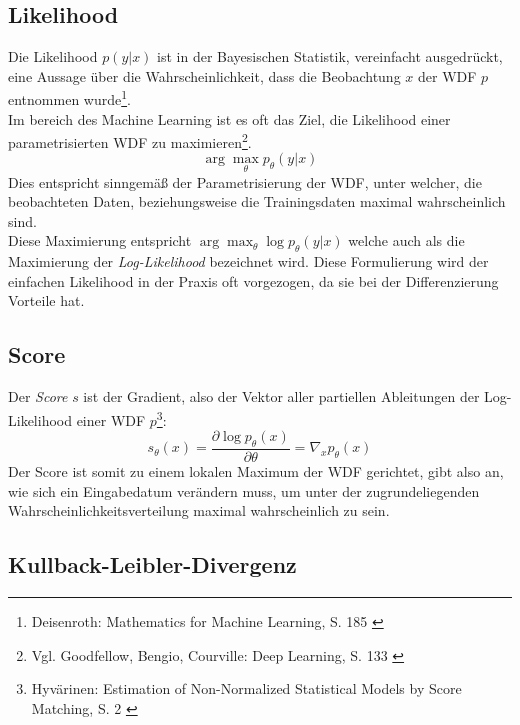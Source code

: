 \subsection{Likelihood}

Die Likelihood $p(y|x)$ ist in der Bayesischen Statistik, vereinfacht ausgedrückt, eine Aussage über die Wahrscheinlichkeit, dass die Beobachtung $x$ der WDF $p$ entnommen wurde\footnote{
    Deisenroth: Mathematics for Machine Learning, S. 185
    \cite{Deisenroth2020}
}. \\
Im bereich des Machine Learning ist es oft das Ziel, die Likelihood einer parametrisierten WDF zu maximieren\footnote{
    Vgl. Goodfellow, Bengio, Courville: Deep Learning, S. 133
    \cite{Goodfellow-et-al-2016}
}. 
\begin{equation}
    \arg\max_\theta p_\theta(y|x)
\end{equation}
Dies entspricht sinngemäß der Parametrisierung der WDF, unter welcher, die beobachteten Daten, beziehungsweise die Trainingsdaten maximal wahrscheinlich sind. \\
Diese Maximierung entspricht $\arg\max_\theta \log p_\theta(y|x)$ welche auch als die Maximierung der \textit{Log-Likelihood} bezeichnet wird. Diese Formulierung wird der einfachen Likelihood in der Praxis oft vorgezogen, da sie bei der Differenzierung Vorteile hat.

\subsection{Score}

Der \textit{Score} $s$ ist der Gradient, also der Vektor aller partiellen Ableitungen der Log-Likelihood einer WDF $p$\footnote{
    Hyvärinen: Estimation of Non-Normalized Statistical Models by Score Matching, S. 2
    \cite{JMLR:v6:hyvarinen05a}
}: 
\begin{equation}
    s_\theta(x) = \frac{\partial \log p_\theta(x)}{\partial \theta} 
    = \nabla_x p_\theta(x)
\end{equation}
Der Score ist somit zu einem lokalen Maximum der WDF gerichtet, gibt also an, wie sich ein Eingabedatum verändern muss, um unter der zugrundeliegenden Wahrscheinlichkeitsverteilung maximal wahrscheinlich zu sein.

\subsection{Kullback-Leibler-Divergenz}

